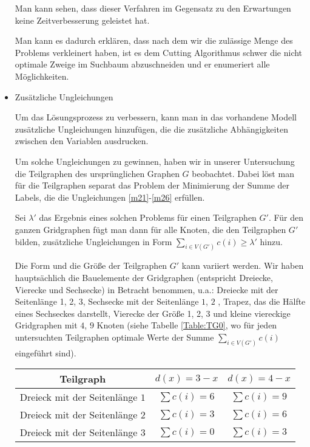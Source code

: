 \documentclass[
	fontsize=12pt,
	paper=a4,
	twoside=false,
	numbers=noenddot,
	plainheadsepline,
	toc=listof,
	toc=bibliography
]{scrartcl}
\begin{document}
\begin{itemize}
	Man kann sehen, dass dieser Verfahren im Gegensatz zu den Erwartungen keine Zeitverbesserung geleistet hat. 
	
	Man kann es dadurch erklären, dass nach dem wir die zulässige Menge des Problems verkleinert haben, ist es dem Cutting Algorithmus schwer die nicht optimale Zweige im Suchbaum abzuschneiden und er enumeriert alle Möglichkeiten.
	
	\item Zusätzliche Ungleichungen
	
	Um das Lösungsprozess zu verbessern, kann man in das vorhandene Modell zusätzliche Ungleichungen hinzufügen, die die zusätzliche Abhängigkeiten zwischen den Variablen ausdrucken.
	
	Um solche Ungleichungen zu gewinnen, haben wir in unserer Untersuchung die Teilgraphen des ursprünglichen Graphen $G$ beobachtet. 
	Dabei löst man für die Teilgraphen separat das Problem der Minimierung der Summe der Labels, die die Ungleichungen \ref{m21}-\ref{m26} erfüllen. 
	
	Sei $\lambda'$ das Ergebnis eines solchen Problems für einen Teilgraphen $G'$. Für den ganzen Gridgraphen fügt man dann für alle Knoten, die den Teilgraphen $G'$ bilden, zusätzliche Ungleichungen in Form $\sum_{i\in V(G')}{c(i)}\ge\lambda'$ hinzu.
		
	Die Form und die Größe der Teilgraphen $G'$ kann variiert werden. Wir haben hauptsächlich die Bauelemente der Gridgraphen (entspricht Dreiecke, Vierecke und Sechsecke) in Betracht benommen, u.a.: Dreiecke mit der Seitenlänge 1, 2, 3, Sechsecke mit der Seitenlänge $1$, $2$ , Trapez, das die Hälfte eines Sechseckes darstellt, Vierecke der Größe 1, 2, 3 und kleine viereckige Gridgraphen mit $4$, $9$ Knoten (siehe Tabelle \ref{Table:TG0}, wo für jeden untersuchten Teilgraphen optimale Werte der Summe $\sum_{i\in V(G')}{c(i)}$ eingeführt sind).
	
	\begin{table}[htbp]
	\centering
	\begin{tabular}{|c|c|c|}
	\hline Teilgraph & $d(x)=3-x$  & $d(x)=4-x$\\ \hline 
		Dreieck mit der Seitenlänge $1$ & $\sum{c(i)}=6$ & $\sum{c(i)}=9$ \\
		Dreieck mit der Seitenlänge $2$ & $\sum{c(i)}=3$ & $\sum{c(i)}=6$ \\
		Dreieck mit der Seitenlänge $3$ & $\sum{c(i)}=0$ & $\sum{c(i)}=3$ \\ \hline
		

\end{tabular}
\end{table}
\end{itemize}
\end{document}
